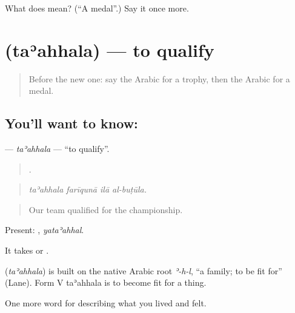\begin{tcolorbox}[breakable,colback=teal!4,colframe=teal!35!black,title={Before you move on}]
What does  mean? (\textquotedblleft{}A medal\textquotedblright{}.) Say it once more.
\end{tcolorbox}
\section[\texorpdfstring{\ar{تأهل} (taʾahhala)}{تأهل (taʾahhala)}]{ (taʾahhala) — to qualify}

\label{lesson:AR-C547-taahhala}



\begin{quote}
Before the new one: say the Arabic for a trophy, then the Arabic for a medal.
\end{quote}

\subsection*{You'll want to know: }
\textbf{} — \emph{taʾahhala} — \textquotedblleft{}to qualify\textquotedblright{}.

\begin{quote}
   .
\end{quote}

\begin{quote}
\emph{taʾahhala farīqunā ilā al-buṭūla.}
\end{quote}

\begin{quote}
Our team qualified for the championship.
\end{quote}

Present: , \emph{yataʾahhal}.

It takes  or .

\begin{cousinweb}
\textbf{} (\emph{taʾahhala}) is built on the native Arabic root \emph{ʾ-h-l}, \textquotedblleft{}a family; to be fit for\textquotedblright{} (Lane). Form V taʾahhala is to become fit for a thing.
\end{cousinweb}

\begin{grammarlens}[title={What you've built}]
One more word for describing what you lived and felt.
\end{grammarlens}


